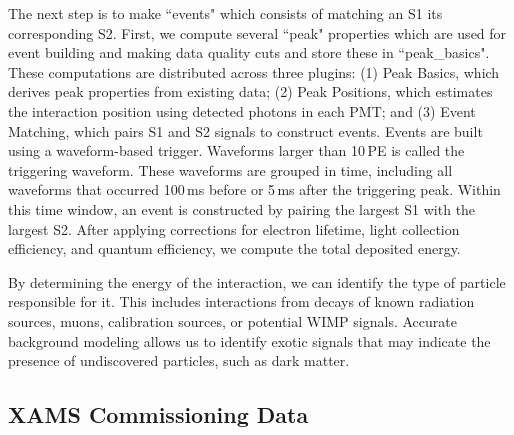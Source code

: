 The next step is to make ``events" which consists of matching an S1 its corresponding S2. First, we compute several ``peak" properties which are used for event building and making data quality cuts and store these in ``peak\_basics". These computations are distributed across three plugins: (1) Peak Basics, which derives peak properties from existing data; (2) Peak Positions, which estimates the interaction position using detected photons in each PMT; and (3) Event Matching, which pairs S1 and S2 signals to construct events. Events are built using a waveform-based trigger. Waveforms larger than 10\,PE is called the triggering waveform. These waveforms are grouped in time, including all waveforms that occurred 100\,ms before or 5\,ms after the triggering peak. Within this time window, an event is constructed by pairing the largest S1 with the largest S2. After applying corrections for electron lifetime, light collection efficiency, and quantum efficiency, we compute the total deposited energy.



By determining the energy of the interaction, we can identify the type of particle responsible for it. This includes interactions from decays of known radiation sources, muons, calibration sources, or potential WIMP signals. Accurate background modeling allows us to identify exotic signals that may indicate the presence of undiscovered particles, such as dark matter.

\subsection{XAMS Commissioning Data}
\label{sec:commissioning_data}

